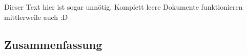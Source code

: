 \documentclass[Typ=Mitschrieb,Jake]{Lilly}
\begin{document}
Dieser Text hier ist sogar unnötig. Komplett leere Dokumente funktionieren mittlerweile auch :D



\subsection{Zusammenfassung}





\end{document}
